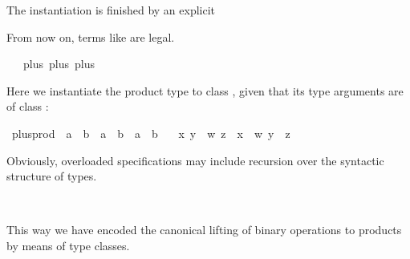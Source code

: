 \begin{isabellebody}
\begin{isamarkuptext}
The instantiation is finished by an explicit%
\end{isamarkuptext}%
\isamarkuptrue%
\isamarkupfalse%
%
\begin{isamarkuptext}%
\noindent From now on, terms like  are
legal.%
\end{isamarkuptext}%
\isamarkuptrue%
\isamarkupfalse%
\ {\isachardoublequoteopen}{\isacharasterisk}{\isachardoublequoteclose}\ {\isacharcolon}{\isacharcolon}\ {\isacharparenleft}plus{\isacharcomma}\ plus{\isacharparenright}\ plus\isanewline
{}%
\begin{isamarkuptext}%
\noindent Here we instantiate the product type \isa{{\isacharasterisk}} to
class , given that its type arguments are of
class :%
\end{isamarkuptext}%
\isamarkuptrue%
\isamarkupfalse%
\ plus{\isacharunderscore}prod\ {\isacharcolon}{\isacharcolon}\ {\isachardoublequoteopen}{\isacharprime}a\ {\isasymtimes}\ {\isacharprime}b\ {\isasymRightarrow}\ {\isacharprime}a\ {\isasymtimes}\ {\isacharprime}b\ {\isasymRightarrow}\ {\isacharprime}a\ {\isasymtimes}\ {\isacharprime}b{\isachardoublequoteclose}\ \isanewline
\ \ {\isachardoublequoteopen}{\isacharparenleft}x{\isacharcomma}\ y{\isacharparenright}\ {\isasymoplus}\ {\isacharparenleft}w{\isacharcomma}\ z{\isacharparenright}\ {\isacharequal}\ {\isacharparenleft}x\ {\isasymoplus}\ w{\isacharcomma}\ y\ {\isasymoplus}\ z{\isacharparenright}{\isachardoublequoteclose}%
\begin{isamarkuptext}%
\noindent Obviously, overloaded specifications may include
recursion over the syntactic structure of types.%
\end{isamarkuptext}%
\isamarkuptrue%
\isamarkupfalse%
%
\isadelimproof
\ %
\endisadelimproof
%
\isatagproof
\isacommand{{\isachardot}{\isachardot}}\isamarkupfalse%
%
\endisatagproof
{\isafoldproof}%
%
\isadelimproof
%
\endisadelimproof
\isanewline
\isanewline
{}\isamarkupfalse%
%
\begin{isamarkuptext}%
\noindent This way we have encoded the canonical lifting of
binary operations to products by means of type classes.%
\end{isamarkuptext}%
\isamarkuptrue%
%
\isadelimtheory
%
\endisadelimtheory
%
\isatagtheory
%
\endisatagtheory
{\isafoldtheory}%
%
\isadelimtheory
%
\endisadelimtheory
\end{isabellebody}%
